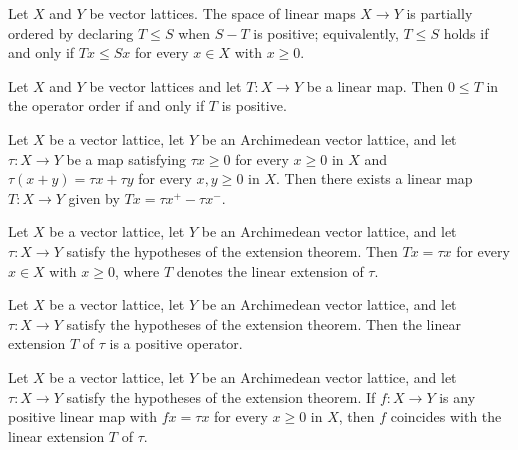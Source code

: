 \begin{lemma}
\label{lem:positive-le-iff}
\leanok
{}
Let $X$ and $Y$ be vector lattices. The space of linear maps
$X \to Y$ is partially ordered by declaring $T \le S$ when $S - T$
is positive; equivalently, $T \le S$ holds if and only if $T x \le
S x$ for every $x \in X$ with $x \ge 0$.
\end{lemma}

\begin{lemma}
\label{lem:positive-zero-le-iff}
\leanok
{}
Let $X$ and $Y$ be vector lattices and let $T \colon X \to Y$ be a
linear map. Then $0 \le T$ in the operator order if and only if
$T$ is positive.
\end{lemma}

\begin{theorem}
\label{thm:positive-extension}
\leanok
{}
Let $X$ be a vector lattice, let $Y$ be an Archimedean vector
lattice, and let $\tau \colon X \to Y$ be a map satisfying $\tau x
\ge 0$ for every $x \ge 0$ in $X$ and $\tau (x + y) = \tau x +
\tau y$ for every $x, y \ge 0$ in $X$. Then there exists a linear
map $T \colon X \to Y$ given by $T x = \tau x^{+} - \tau x^{-}$.
\end{theorem}

\begin{lemma}
\label{lem:positive-extension-nonneg}
\leanok
{}
Let $X$ be a vector lattice, let $Y$ be an Archimedean vector
lattice, and let $\tau \colon X \to Y$ satisfy the hypotheses of
the extension theorem. Then $T x = \tau x$ for every $x \in X$
with $x \ge 0$, where $T$ denotes the linear extension of $\tau$.
\end{lemma}

\begin{theorem}
\label{thm:positive-extension-positive}
\leanok
{}
Let $X$ be a vector lattice, let $Y$ be an Archimedean vector
lattice, and let $\tau \colon X \to Y$ satisfy the hypotheses of
the extension theorem. Then the linear extension $T$ of $\tau$ is
a positive operator.
\end{theorem}

\begin{theorem}
\label{thm:positive-extension-unique}
\leanok
{}
Let $X$ be a vector lattice, let $Y$ be an Archimedean vector
lattice, and let $\tau \colon X \to Y$ satisfy the hypotheses of
the extension theorem. If $f \colon X \to Y$ is any positive
linear map with $f x = \tau x$ for every $x \ge 0$ in $X$, then
$f$ coincides with the linear extension $T$ of $\tau$.
\end{theorem}

